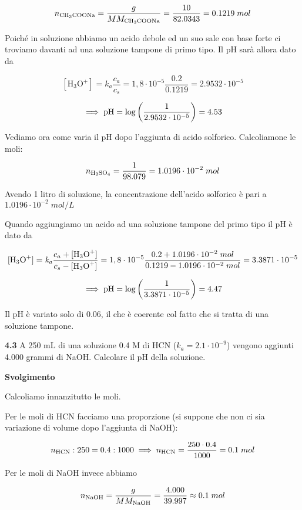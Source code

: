 $$n_{\rm CH_3COONa}=\frac{g}{MM_{\rm CH_3COONa}}=\frac{10}{82.0343}=0.1219\;mol$$

Poiché in soluzione abbiamo un acido debole ed un suo sale con base forte ci troviamo davanti ad una soluzione tampone di primo tipo. Il pH sarà allora dato da

$$[\text{H}_3\text{O}^+]
=k_a \frac{c_a}{c_s}
=1,8 \cdot 10^{-5} \frac{0.2}{0.1219}
=2.9532 \cdot 10^{-5}$$

$$\implies \rm pH=\log{\left( \frac{1}{2.9532 \cdot 10^{-5}} \right)}=4.53$$

Vediamo ora come varia il pH dopo l'aggiunta di acido solforico. Calcoliamone le moli:

$$n_{\rm H_2SO_4}=\frac{1}{98.079}=1.0196 \cdot 10^{-2}\;mol$$

Avendo 1 litro di soluzione, la concentrazione dell'acido solforico è pari a $1.0196 \cdot 10^{-2}\;mol/L$

Quando aggiungiamo un acido ad una soluzione tampone del primo tipo il pH è dato da

$${[\text{H}_3\text{O}^+]}=\textit{k}_\textit{a} \frac{c_a + \rm{[\text{H}_3\text{O}^+]}}{c_s - \rm{[\text{H}_3\text{O}^+]}}
=1,8 \cdot 10^{-5} \frac{0.2 + 1.0196 \cdot 10^{-2}\;mol}{0.1219 - 1.0196 \cdot 10^{-2}\;mol}
=3.3871 \cdot 10^{-5}$$

$$\implies \rm pH=\log{\left( \frac{1}{3.3871 \cdot 10^{-5}} \right)}=4.47$$

Il pH è variato solo di 0.06, il che è coerente col fatto che si tratta di una soluzione tampone.

\vspace{0.2cm}\textbf{4.3} A 250 mL di una soluzione 0.4 M di HCN ($k_a = 2.1 \cdot 10^{-9}$) vengono aggiunti 4.000 grammi di NaOH. Calcolare il pH della soluzione.

\vspace{0.2cm}\large\textbf{Svolgimento}\normalsize

\vspace{0.2cm}Calcoliamo innanzitutto le moli.

Per le moli di HCN facciamo una proporzione (si suppone che non ci sia variazione di volume dopo l'aggiunta di NaOH):

$$n_{\rm HCN}:250=0.4:1000
\implies
n_{\rm HCN}=\frac{250 \cdot 0.4}{1000}=0.1\;mol$$

Per le moli di NaOH invece abbiamo

$$n_{\rm NaOH}=\frac{g}{MM_{\rm NaOH}}
=\frac{4.000}{39.997} \approx 0.1\;mol$$

